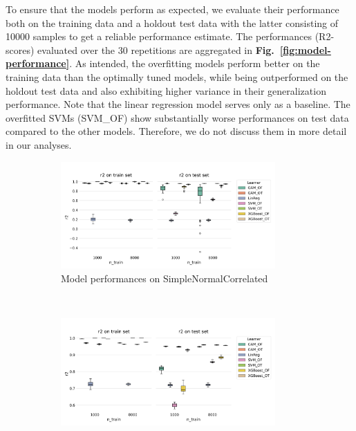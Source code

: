 \documentclass[runningheads]{llncs}
\begin{document}
To ensure that the models perform as expected, we evaluate their performance
both on the training data and a holdout test data with the latter consisting of
10000 samples to get a reliable performance estimate. The performances (R2-scores)
evaluated over the 30 repetitions are aggregated in
\textbf{Fig.~\ref{fig:model-performance}}. As intended,
the overfitting models perform better on the training data than the optimally
tuned models, while being outperformed on the holdout test data and also
exhibiting higher variance in their generalization performance. Note that the
linear regression model serves only as a baseline. The overfitted SVMs (SVM\_OF)
show substantially worse performances on test data compared to the other
models. Therefore, we do not discuss them in more detail in our analyses.

\begin{figure}[h!]
    \centering
    \begin{subfigure}[b]{\textwidth}
        \centering
        \includegraphics[width=0.9\textwidth]{img/model_performance_SimpleNormalCorrelated.png}
        \caption{Model performances on SimpleNormalCorrelated}
    \end{subfigure}
    \\[10pt]
    \vfill
    \begin{subfigure}[b]{\textwidth}
        \centering
        \includegraphics[width=0.9\textwidth]{img/model_performance_Friedman1.png}

\end{subfigure}
\end{figure}
\end{document}
